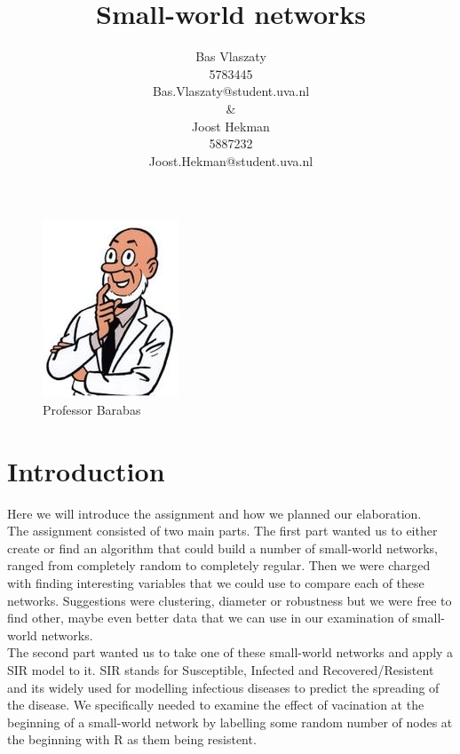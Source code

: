 \documentclass[a4paper]{article}
\author{Bas Vlaszaty \\ 5783445 \\ Bas.Vlaszaty@student.uva.nl \\ \& 
  \\ Joost Hekman \\ 5887232 \\ Joost.Hekman@student.uva.nl}
\title{Small-world networks}
\theoremstyle{definition}
\begin{document}
\maketitle

\begin{center}
  \begin{figure}[H]
    \centering
    \includegraphics[scale=0.7]{barabas.jpg}
    \caption{Professor Barabas}
    \label{fig:barabas}
  \end{figure}
\end{center}

\newpage
\tableofcontents

\newpage
\section{Introduction}
Here we will introduce the assignment and how we planned our elaboration.\\

The assignment consisted of two main parts. The first part wanted us to
either create or find an algorithm that could build a number of small-world
networks, ranged from completely random to completely regular. Then we were
charged with finding interesting variables that we could use to compare each
of these networks. Suggestions were clustering, diameter or robustness but
we were free to find other, maybe even better data that we can use in our
examination of small-world networks.\\

The second part wanted us to take one of these small-world networks and
apply a SIR model to it. SIR stands for Susceptible, Infected and
Recovered/Resistent and its widely used for modelling infectious diseases to
predict the spreading of the disease. We specifically needed to examine the
effect of vacination at the beginning of a small-world network by labelling
some random number of nodes at the beginning with R as them being
resistent.\\
\end{document}
